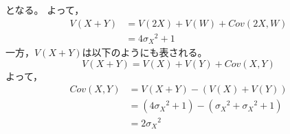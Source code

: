 \documentclass[class=jsarticle, crop=false, dvipdfmx, fleqn]{standalone}
\begin{document}
となる。
よって，
\begin{equation}
\begin{split}
V(X + Y) & = V(2X) + V(W) + Cov(2X, W) \\
	& = 4{\sigma_X}^2 + 1
\end{split}
\end{equation}
一方，$V(X + Y)$は以下のようにも表される。
\begin{equation}
V(X + Y) = V(X) + V(Y) + Cov(X, Y)
\end{equation}
よって，
\begin{equation}
\begin{split}
Cov(X, Y) & = V(X + Y) - (V(X) + V(Y)) \\
	& = (4{\sigma_X}^2 + 1) - ({\sigma_X}^2 + {\sigma_X}^2 + 1) \\
	& = 2{\sigma_X}^2
\end{split}
\end{equation}
\end{document}
